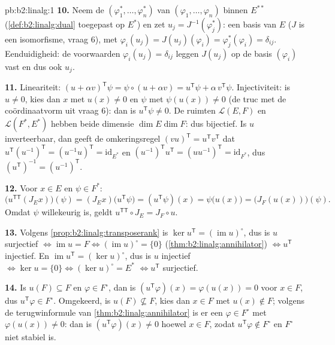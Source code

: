 \begin{solution}{pb:b2:linalg:1}
\textbf{10.} Neem de  $(\varphi_1^*, \dots,
\varphi_n^*)$ van $(\varphi_1, \dots, \varphi_n)$ binnen $E^{**}$
(\cref{def:b2:linalg:dual} toegepast op $E^*$) en zet $u_j =
J^{-1}(\varphi_j^*)$: een basis van $E$ ($J$ is een isomorfisme,
vraag 6), met $\varphi_i(u_j) = J(u_j)(\varphi_i) =
\varphi_j^*(\varphi_i) = \delta_{ij}$. Eenduidigheid: de
voorwaarden $\varphi_i(u_j) = \delta_{ij}$ leggen $J(u_j)$ op de
basis $(\varphi_i)$ vast en dus ook $u_j$.

\textbf{11.} Lineariteit: $(u + \alpha v)^{\mathsf T}\psi = \psi
\circ (u + \alpha v) = u^{\mathsf T}\psi + \alpha\, v^{\mathsf
T}\psi$. Injectiviteit: is $u \neq 0$, kies dan $x$ met $u(x) \neq
0$ en $\psi$ met $\psi(u(x)) \neq 0$ (de truc met de
coördinaatvorm uit vraag 6): dan is $u^{\mathsf T}\psi \neq 0$. De
ruimten $\mathcal{L}(E,F)$ en $\mathcal{L}(F^*, E^*)$ hebben beide
dimensie $\dim E \dim F$: dus bijectief. Is $u$ inverteerbaar, dan
geeft de omkeringsregel $(vu)^{\mathsf T} = u^{\mathsf
T}v^{\mathsf T}$ dat $u^{\mathsf T}(u^{-1})^{\mathsf T} =
(u^{-1}u)^{\mathsf T} = \mathrm{id}_{E^*}$ en
$(u^{-1})^{\mathsf T}u^{\mathsf T} = (uu^{-1})^{\mathsf T} =
\mathrm{id}_{F^*}$, dus $(u^{\mathsf T})^{-1} = (u^{-1})^{\mathsf
T}$.

\textbf{12.} Voor $x \in E$ en $\psi \in F^*$:
\[
\bigl(u^{\mathsf T\mathsf T}(J_E x)\bigr)(\psi)
= (J_E x)\bigl(u^{\mathsf T}\psi\bigr)
= (u^{\mathsf T}\psi)(x)
= \psi\bigl(u(x)\bigr)
= \bigl(J_F(u(x))\bigr)(\psi).
\]
Omdat $\psi$ willekeurig is, geldt $u^{\mathsf T\mathsf T} \circ
J_E = J_F \circ u$.

\textbf{13.} Volgens \cref{prop:b2:linalg:transposerank} is $\ker
u^{\mathsf T} = (\operatorname{im} u)^\circ$, dus is $u$
surjectief $\iff \operatorname{im} u = F \iff
(\operatorname{im}u)^\circ = \{0\}$
(\cref{thm:b2:linalg:annihilator}) $\iff u^{\mathsf T}$ injectief.
En $\operatorname{im} u^{\mathsf T} = (\ker u)^\circ$, dus is $u$
injectief $\iff \ker u = \{0\} \iff (\ker u)^\circ = E^*$ $\iff
u^{\mathsf T}$ surjectief.

\textbf{14.} Is $u(F) \subseteq F$ en $\varphi \in F^\circ$, dan is
$(u^{\mathsf T}\varphi)(x) = \varphi(u(x)) = 0$ voor $x \in F$,
dus $u^{\mathsf T}\varphi \in F^\circ$. Omgekeerd, is $u(F)
\not\subseteq F$, kies dan $x \in F$ met $u(x) \notin F$; volgens
de terugwinformule van \cref{thm:b2:linalg:annihilator} is er een
$\varphi \in F^\circ$ met $\varphi(u(x)) \neq 0$: dan is
$(u^{\mathsf T}\varphi)(x) \neq 0$ hoewel $x \in F$, zodat
$u^{\mathsf T}\varphi \notin F^\circ$ en $F^\circ$ niet stabiel
is.


\end{solution}
